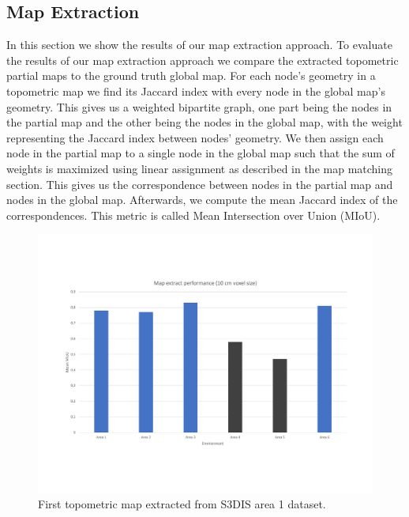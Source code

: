 \subsection{Map Extraction}
In this section we show the results of our map extraction approach. To evaluate the results of our map extraction approach we compare the extracted topometric partial maps to the ground truth global map. For each node's geometry in a topometric map we find its Jaccard index with every node in the global map's geometry. This gives us a weighted bipartite graph, one part being the nodes in the partial map and the other being the nodes in the global map, with the weight representing the Jaccard index between nodes' geometry. We then assign each node in the partial map to a single node in the global map such that the sum of weights is maximized using linear assignment as described in the map matching section. This gives us the correspondence between nodes in the partial map and nodes in the global map. Afterwards, we compute the mean Jaccard index of the correspondences. This metric is called Mean Intersection over Union (MIoU). 

\begin{figure}[h]
    \centering
    \includegraphics*[width=\textwidth]{./fig/map_extract_performance_10cm.pdf}
    \caption{First topometric map extracted from S3DIS area 1 dataset.}
    \label{fig:map_extract_perf}
\end{figure}


